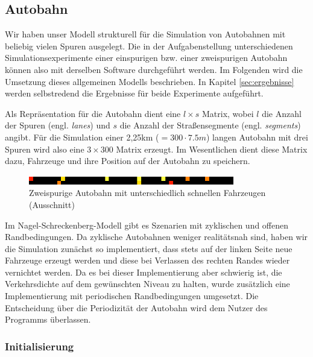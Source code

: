 \documentclass[10pt, a4paper]{article}
\newcommand\nsm{Nagel-Schreckenberg-Modell }
\begin{document}
\subsection{Autobahn}
\label{subsec:umsetzung-autobahn}

Wir haben unser Modell strukturell für die Simulation von Autobahnen mit beliebig vielen Spuren ausgelegt. Die in der Aufgabenstellung unterschiedenen Simulationsexperimente einer einspurigen bzw. einer zweispurigen Autobahn können also mit derselben Software durchgeführt werden. Im Folgenden wird die Umsetzung dieses allgemeinen Modells beschrieben. In Kapitel \ref{sec:ergebnisse} werden selbstredend die Ergebnisse für beide Experimente aufgeführt.

Als Repräsentation für die Autobahn dient eine $l \times s$ Matrix, wobei $l$ die Anzahl der Spuren (engl. \emph{lanes}) und $s$ die Anzahl der Straßensegmente (engl. \emph{segments}) angibt. Für die Simulation einer 2,25km ($= 300 \cdot 7.5m$) langen Autobahn mit drei Spuren wird also eine $3 \times 300$ Matrix erzeugt. Im Wesentlichen dient diese Matrix dazu, Fahrzeuge und ihre Position auf der Autobahn zu speichern.\\

\begin{figure}[h!]
	\centering
	\includegraphics[width=0.8\textwidth]{img/twoLaneRoad}
	\caption{Zweispurige Autobahn mit unterschiedlich schnellen Fahrzeugen (Ausschnitt)}
	\label{fig:twoLaneRoad}
\end{figure}

Im \nsm gibt es Szenarien mit zyklischen und offenen Randbedingungen. Da zyklische Autobahnen weniger realitätsnah sind, haben wir die Simulation zunächst so implementiert, dass stets auf der linken Seite neue Fahrzeuge erzeugt werden und diese bei Verlassen des rechten Randes wieder vernichtet werden. Da es bei dieser Implementierung aber schwierig ist, die Verkehrsdichte auf dem gewünschten Niveau zu halten, wurde zusätzlich eine Implementierung mit periodischen Randbedingungen umgesetzt. Die Entscheidung über die Periodizität der Autobahn wird dem Nutzer des Programms überlassen.

\subsubsection{Initialisierung}
\label{subsubsec:initialisierung}
\end{document}
